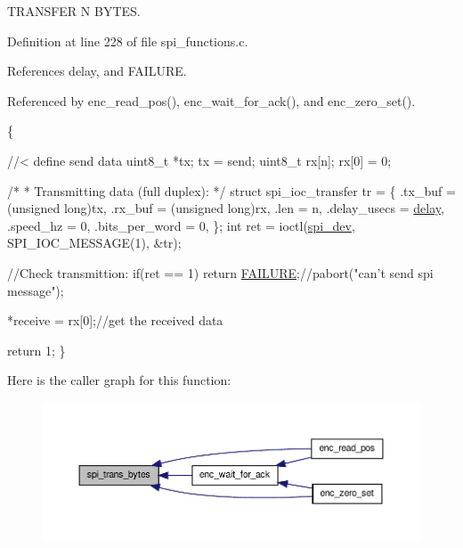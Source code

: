 T\-R\-A\-N\-S\-F\-E\-R N B\-Y\-T\-E\-S. 



Definition at line 228 of file spi\-\_\-functions.\-c.



References delay, and F\-A\-I\-L\-U\-R\-E.



Referenced by enc\-\_\-read\-\_\-pos(), enc\-\_\-wait\-\_\-for\-\_\-ack(), and enc\-\_\-zero\-\_\-set().


\begin{DoxyCode}
                                                                      \{

         \textcolor{comment}{//< define send data }
        uint8\_t *tx;
        tx = send;
        uint8\_t rx[n]; 
        rx[0] = 0;

        \textcolor{comment}{/*}
\textcolor{comment}{        * Transmitting data (full duplex):}
\textcolor{comment}{        */}
        \textcolor{keyword}{struct }spi\_ioc\_transfer tr = \{
                .tx\_buf = (\textcolor{keywordtype}{unsigned} long)tx,
                .rx\_buf = (\textcolor{keywordtype}{unsigned} \textcolor{keywordtype}{long})rx,
                .len = n,
                .delay\_usecs = \hyperlink{communication_2spi__functions_8c_adc4674f6ea53803d98fa2ec36759e77d}{delay},
                .speed\_hz = 0,
                .bits\_per\_word = 0,
        \};
        \textcolor{keywordtype}{int} ret = ioctl(\hyperlink{CommunicationV0_2communication_8c_a4788f0a5355494bc6c13690e28f43783}{spi\_dev}, SPI\_IOC\_MESSAGE(1), &tr);

        \textcolor{comment}{//Check transmittion:}
        \textcolor{keywordflow}{if}(ret == 1) \textcolor{keywordflow}{return} \hyperlink{communication_2spi__functions_8c_a6d58f9ac447476b4e084d7ca383f5183}{FAILURE};\textcolor{comment}{//pabort("can't send spi message");}

        *receive = rx[0];\textcolor{comment}{//get the received data}

        \textcolor{keywordflow}{return} 1;
\}
\end{DoxyCode}


Here is the caller graph for this function\-:
\nopagebreak
\begin{figure}[H]
\begin{center}
\leavevmode
\includegraphics[width=350pt]{group__spi_ga3ae450d2b3ece27bb6036f811a7625a9_icgraph}
\end{center}
\end{figure}


